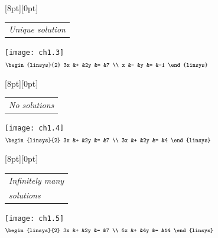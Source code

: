 \begin{center}
  \begin{minipage}[b]{1.45in}
    \raisebox{-2pt}[8pt][0pt]{\small \begin{tabular}{@{}l}
      \small \textit{Unique solution}
    \end{tabular}}
    \begin{center}
      \texttt{[image: ch1.3]} \\
      $\scriptstyle \begin{linsys}{2}
                         3x  &+  &2y  &=  &7   \\
                         x   &-  &y   &=  &-1
                       \end{linsys}$
    \end{center}
  \end{minipage}
  \hspace*{0em}
  \begin{minipage}[b]{1.45in}
    \raisebox{-2pt}[8pt][0pt]{\small \begin{tabular}{@{}l}
      \small \textit{No solutions}
    \end{tabular}}
    \begin{center}
      \texttt{[image: ch1.4]} \\
      $\scriptstyle \begin{linsys}{2}
                         3x  &+  &2y  &=  &7   \\
                         3x  &+  &2y  &=  &4
                       \end{linsys}$
    \end{center}
  \end{minipage}
  \hspace*{0em}
  \begin{minipage}[b]{1.45in}
    \raisebox{-2pt}[8pt][0pt]{\small \begin{tabular}[t]{@{}l}
      \textit{Infinitely many} \\
      \textit{solutions}
    \end{tabular}}
    \begin{center}
      \texttt{[image: ch1.5]}         \\
      $\scriptstyle \begin{linsys}{2}
                         3x  &+  &2y  &=  &7   \\
                         6x  &+  &4y  &=  &14
                       \end{linsys}$
    \end{center}
  \end{minipage}
\end{center}

